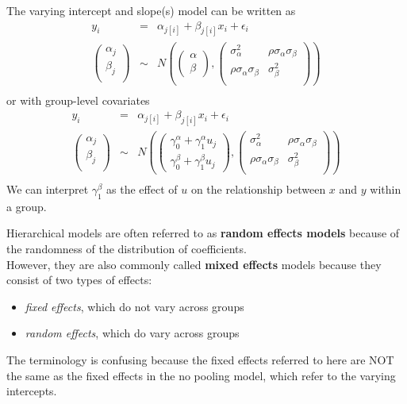 \documentclass[handout]{beamer}
\begin{document}
\begin{frame}
The varying intercept and slope(s) model can be written as 
\begin{eqnarray*}
y_i &=& \alpha_{j[i]} + \beta_{j[i]} x_i + \epsilon_i \\
\begin{pmatrix}
\alpha_j\\
\beta_j\\
\end{pmatrix} 
&\sim& N \left( 
\begin{pmatrix}
\alpha \\
\beta
\end{pmatrix},
\begin{pmatrix}
\sigma^2_{\alpha} & \rho \sigma_{\alpha} \sigma_{\beta} \\
\rho \sigma_{\alpha} \sigma_{\beta} & \sigma^2_{\beta} \\
\end{pmatrix}
\right)\\
\end{eqnarray*}
\pause
or with group-level covariates
\begin{eqnarray*}
y_i &=& \alpha_{j[i]} + \beta_{j[i]} x_i + \epsilon_i \\
\begin{pmatrix}
\alpha_j\\
\beta_j\\
\end{pmatrix} 
&\sim& N \left( 
\begin{pmatrix}
\gamma_0^{\alpha} + \gamma_1^{\alpha} u_j \\
\gamma_0^{\beta} + \gamma_1^{\beta} u_j
\end{pmatrix},
\begin{pmatrix}
\sigma^2_{\alpha} & \rho \sigma_{\alpha} \sigma_{\beta} \\
\rho \sigma_{\alpha} \sigma_{\beta} & \sigma^2_{\beta} \\
\end{pmatrix}
\right)\\
\end{eqnarray*}
\pause
We can interpret $\gamma_1^{\beta}$ as the effect of $u$ on the
relationship between $x$ and $y$ within a group.
\end{frame}

\begin{frame}
Hierarchical models are often referred to as \textbf{random effects
models} because of the randomness of the distribution of coefficients.\\
\bigskip
\pause
However, they are also commonly called \textbf{mixed effects} models
because they consist of two types of effects:
\pause
\begin{itemize}
\item \textit{fixed effects}, which do not vary across groups
\pause
\item \textit{random effects}, which do vary across groups
\end{itemize}
\pause
\bigskip
The terminology is confusing because the fixed effects referred to
here are NOT the same as the fixed effects in the no pooling model,
which refer to the varying intercepts.
\end{frame}
\end{document}
